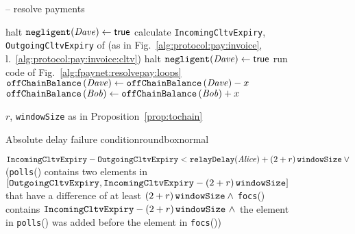 \begin{figure}[H]
\begin{systembox}{\fpaynet{} -- resolve payments}
\begin{algorithmic}[1]
                    \State halt 
                    \label{alg:fpaynet:resolvepay:halt:rel}
                  \Else
                    \State $\mathtt{negligent}(\mathit{Dave}) \gets \mathsf{true}$
                  \EndIf
                \ElsIf{$\dave{} \neq \alice$}
                  \State calculate \texttt{IncomingCltvExpiry},
                  \texttt{OutgoingCltvExpiry} of \dave{} (as in
                  Fig.~\ref{alg:protocol:pay:invoice},
                  l.~\ref{alg:protocol:pay:invoice:cltv})
                      \State halt 
                      \label{alg:fpaynet:resolvepay:halt:abs}
                    \Else
                      \State $\mathtt{negligent}(\mathit{Dave}) \gets \mathsf{true}$
                    \EndIf
                  \EndIf
                \EndIf
                \State run code of Fig.~\ref{alg:fpaynet:resolvepay:loops}
                \State $\mathtt{offChainBalance}\left(\mathit{Dave}\right) \gets
                \mathtt{offChainBalance}\left(\mathit{Dave}\right) - x$
                \label{alg:fpaynet:resolvepay:debit}
                \State $\mathtt{offChainBalance}\left(\mathit{Bob}\right) \gets
                \mathtt{offChainBalance}\left(\mathit{Bob}\right) + x$
                \label{alg:fpaynet:resolvepay:credit}
              \EndIf
            \EndFor
          \EndFor
        \EndIndent
      \end{algorithmic}
    \end{systembox}
    \caption{$r$, \texttt{windowSize} as in Proposition~\ref{prop:tochain}}
    \label{alg:fpaynet:resolvepay}
  \end{figure}

  \begin{figure}[H]
    \begin{titlebox}{\normalfont Absolute delay failure
    condition}{roundbox}{normal}
      \begin{algorithmic}[1,nonumber]
        \State $\mathtt{IncomingCltvExpiry} - \mathtt{OutgoingCltvExpiry} <
        \mathtt{relayDelay}(\mathit{Alice}) + \left(2 + r\right)\texttt{windowSize}{} \: \vee$
        \State (\texttt{polls}(\dave) contains two elements in
        $[\mathtt{OutgoingCltvExpiry}, \mathtt{IncomingCltvExpiry} -
        \left(2 + r\right)\texttt{windowSize}{}]$ that have a difference of at least $\left(2 + r\right)\texttt{windowSize}{} \: \wedge$
        \State \texttt{focs}(\dave) contains $\mathtt{IncomingCltvExpiry} -
        \left(2 + r\right)\texttt{windowSize}{} \ \wedge$
        \State the element in \texttt{polls}(\dave) was added before the element
        in \texttt{focs}(\dave))
      \end{algorithmic}
    \end{titlebox}
    \caption{}
    \label{alg:fpaynet:resolvepay:haltcond:abs}
  \end{figure}

